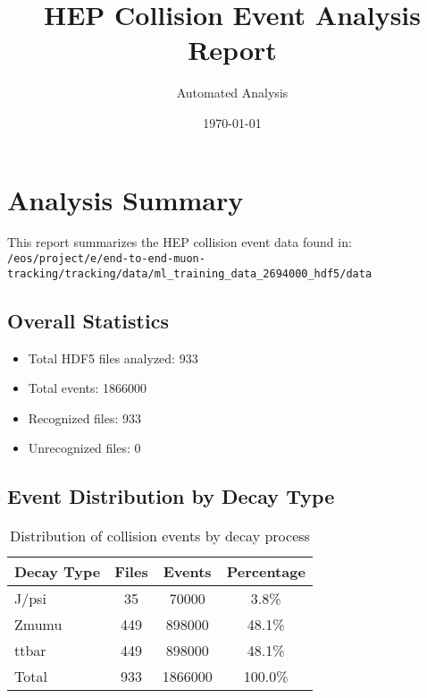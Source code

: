 \documentclass{article}
\title{HEP Collision Event Analysis Report}
\author{Automated Analysis}
\date{\today}
\begin{document}
\maketitle

\section{Analysis Summary}

This report summarizes the HEP collision event data found in:\\
\texttt{/eos/project/e/end-to-end-muon-tracking/tracking/data/ml_training_data_2694000_hdf5/data}

\subsection{Overall Statistics}
\begin{itemize}
    \item Total HDF5 files analyzed: 933
    \item Total events: \num{1866000}
    \item Recognized files: 933
    \item Unrecognized files: 0
\end{itemize}

\subsection{Event Distribution by Decay Type}

\begin{table}[htbp]
\centering
\begin{tabular}{lccc}
\toprule
Decay Type & Files & Events & Percentage \\
\midrule
J/psi & 35 & \num{70000} & 3.8\% \\
Zmumu & 449 & \num{898000} & 48.1\% \\
ttbar & 449 & \num{898000} & 48.1\% \\
\midrule
Total & 933 & \num{1866000} & 100.0\% \\
\bottomrule
\end{tabular}
\caption{Distribution of collision events by decay process}
\end{table}
\end{document}
